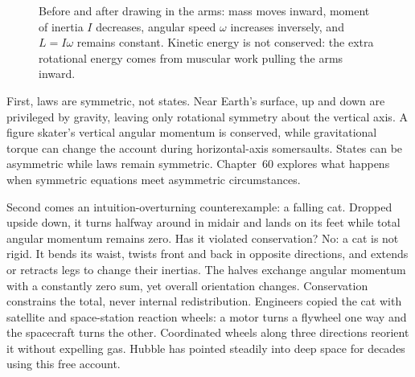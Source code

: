 \begin{figure}[htbp]
\centering
{}
\caption{Before and after drawing in the arms: mass moves inward, moment of inertia \(I\) decreases, angular speed \(\omega\) increases inversely, and \(L=I\omega\) remains constant. Kinetic energy is not conserved: the extra rotational energy comes from muscular work pulling the arms inward.}
\end{figure}


First, laws are symmetric, not states. Near Earth's surface, up and down are privileged by gravity, leaving only rotational symmetry about the vertical axis. A figure skater's vertical angular momentum is conserved, while gravitational torque can change the account during horizontal-axis somersaults. States can be asymmetric while laws remain symmetric. Chapter~60 explores what happens when symmetric equations meet asymmetric circumstances.

Second comes an intuition-overturning counterexample: a falling cat. Dropped upside down, it turns halfway around in midair and lands on its feet while total angular momentum remains zero. Has it violated conservation? No: a cat is not rigid. It bends its waist, twists front and back in opposite directions, and extends or retracts legs to change their inertias. The halves exchange angular momentum with a constantly zero sum, yet overall orientation changes. Conservation constrains the total, never internal redistribution. Engineers copied the cat with satellite and space-station reaction wheels: a motor turns a flywheel one way and the spacecraft turns the other. Coordinated wheels along three directions reorient it without expelling gas. Hubble has pointed steadily into deep space for decades using this free account.

